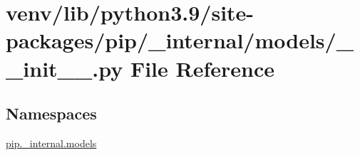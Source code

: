 \hypertarget{venv_2lib_2python3_89_2site-packages_2pip_2__internal_2models_2____init_____8py}{}\section{venv/lib/python3.9/site-\/packages/pip/\+\_\+internal/models/\+\_\+\+\_\+init\+\_\+\+\_\+.py File Reference}
\label{venv_2lib_2python3_89_2site-packages_2pip_2__internal_2models_2____init_____8py}
\subsection*{Namespaces}
\begin{DoxyCompactItemize}
\item 
 \hyperlink{namespacepip_1_1__internal_1_1models}{pip.\+\_\+internal.\+models}
\end{DoxyCompactItemize}
